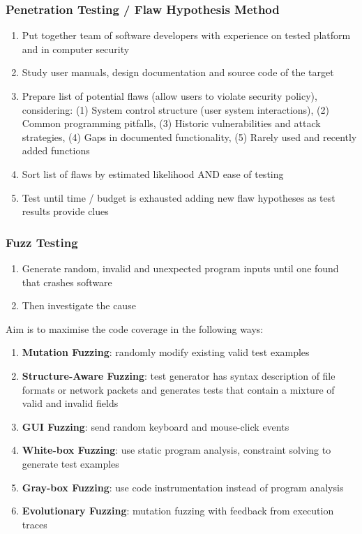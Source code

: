 \documentclass{article}
\begin{document}
\subsubsection{Penetration Testing / Flaw Hypothesis Method}
\begin{enumerate}
	\item Put together team of software developers with experience on tested platform and in computer security
	\item Study user manuals, design documentation and source code of the target
	\item Prepare list of potential flaws (allow users to violate security policy), considering: (1) System control structure (user system interactions), (2) Common programming pitfalls, (3) Historic vulnerabilities and attack strategies, (4) Gaps in documented functionality, (5) Rarely used and recently added functions
	
	\item Sort list of flaws by estimated likelihood AND ease of testing
	\item Test until time / budget is exhausted adding new flaw hypotheses as test results provide clues
\end{enumerate}


\subsubsection{Fuzz Testing}
\begin{enumerate}
	\item Generate random, invalid and unexpected program inputs until one found that crashes software
	\item Then investigate the cause
\end{enumerate}

\noindent 
Aim is to maximise the code coverage in the following ways:
\begin{enumerate}
	\item \textbf{Mutation Fuzzing}: randomly modify existing valid test examples
	
	\item \textbf{Structure-Aware Fuzzing}: test generator has syntax description of file formats or network packets and generates tests that contain a mixture of valid and invalid fields
	
	\item \textbf{GUI Fuzzing}: send random keyboard and mouse-click events
	
	\item \textbf{White-box Fuzzing}: use static program analysis, constraint solving to generate test examples
	
	\item \textbf{Gray-box Fuzzing}: use code instrumentation instead of program analysis
	
	\item \textbf{Evolutionary Fuzzing}: mutation fuzzing with feedback from execution traces
\end{enumerate}
\end{document}
